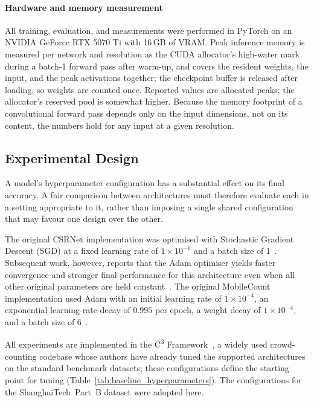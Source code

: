 \documentclass[conference]{IEEEtran}
\begin{document}
\paragraph{Hardware and memory measurement}
All training, evaluation, and measurements were performed in PyTorch on an
NVIDIA GeForce RTX 5070 Ti with 16\,GB of VRAM. Peak inference memory is
measured per network and resolution as the CUDA allocator's high-water mark
during a batch-1 forward pass after warm-up, and covers the resident weights,
the input, and the peak activations together; the checkpoint buffer is released
after loading, so weights are counted once. Reported values are allocated
peaks; the allocator's reserved pool is somewhat higher. Because the memory
footprint of a convolutional forward pass depends only on the input dimensions,
not on its content, the numbers hold for any input at a given resolution.

\subsection{Experimental Design}
A model's hyperparameter configuration has a substantial effect on its final
accuracy. A fair comparison between architectures must therefore evaluate each in
a setting appropriate to it, rather than imposing a single shared configuration
that may favour one design over the other.

The original CSRNet implementation was optimised with Stochastic Gradient
Descent (SGD) at a fixed learning rate of $1\times10^{-6}$ and a batch size of
$1$~\cite{li2018csrnet}. Subsequent work,
however, reports that the Adam optimiser yields faster convergence and stronger
final performance for this architecture even when all other original parameters
are held constant~\cite{jimaging7020021}. The original MobileCount implementation
used Adam with an initial learning rate of $1\times10^{-4}$, an exponential
learning-rate decay of $0.995$ per epoch, a weight decay of $1\times10^{-4}$, and
a batch size of $6$~\cite{wang2020mobilecount}.

All experiments are implemented in the C\textsuperscript{3}
Framework~\cite{gao2019c3}, a widely used crowd-counting codebase whose authors
have already tuned the supported architectures on the standard benchmark
datasets; these configurations define the starting point for tuning
(Table~\ref{tab:baseline_hyperparameters}). The configurations for the ShanghaiTech~Part~B dataset were adopted here.
\end{document}

